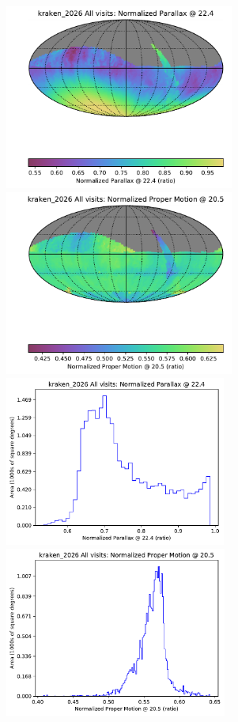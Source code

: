 \documentclass[DM,lsstdraft,authoryear,toc]{lsstdoc}
\begin{document}
\begin{figure}[htb]
\centering
\includegraphics[height=2.4in]{figures/kraken_2026_Normalized_Parallax_@_22_4_All_visits_HEAL_SkyMap}
\includegraphics[height=2.4in]{figures/kraken_2026_Normalized_Proper_Motion_@_20_5_All_visits_HEAL_SkyMap} \\
\includegraphics[height=2.2in]{figures/kraken_2026_Normalized_Parallax_@_22_4_All_visits_HEAL_Histogram}
\includegraphics[height=2.2in]{figures/kraken_2026_Normalized_Proper_Motion_@_20_5_All_visits_HEAL_Histogram}

\end{figure}
\end{document}
